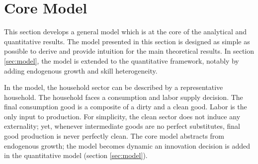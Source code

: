 \section{Core Model}\label{sec:mod_an}

This section develops a general model which is at the core of the analytical and quantitative results. 
The model presented in this section is designed as simple as possible to derive and provide intuition for the main theoretical results. In section \ref{sec:model}, the model is extended to the quantitative framework, notably by adding endogenous growth and skill heterogeneity. %

In the model, the household sector can be described by a representative household. The household faces a consumption and labor supply decision. The final consumption good is a composite of a dirty and a clean good. Labor is the only input to production. For simplicity, the clean sector does not induce any externality; yet, whenever intermediate goods are no perfect substitutes, final good production is never perfectly clean. The core model abstracts from endogenous growth; the model becomes dynamic an innovation decision is added in the quantitative model (section \ref{sec:model}).


